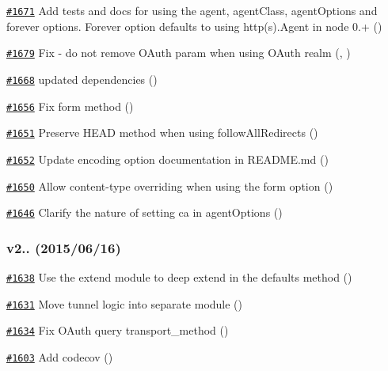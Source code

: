 \begin{DoxyItemize}
\item \href{https://github.com/request/request/pull/1671}{\tt \#1671} Add tests and docs for using the agent, agent\+Class, agent\+Options and forever options. Forever option defaults to using http(s).Agent in node 0.+ ()
\item \href{https://github.com/request/request/pull/1679}{\tt \#1679} Fix -\/ do not remove O\+Auth param when using O\+Auth realm (, )
\item \href{https://github.com/request/request/pull/1668}{\tt \#1668} updated dependencies ()
\item \href{https://github.com/request/request/pull/1656}{\tt \#1656} Fix form method ()
\item \href{https://github.com/request/request/pull/1651}{\tt \#1651} Preserve H\+E\+AD method when using follow\+All\+Redirects ()
\item \href{https://github.com/request/request/pull/1652}{\tt \#1652} Update {\ttfamily encoding} option documentation in R\+E\+A\+D\+M\+E.\+md ()
\item \href{https://github.com/request/request/pull/1650}{\tt \#1650} Allow content-\/type overriding when using the {\ttfamily form} option ()
\item \href{https://github.com/request/request/pull/1646}{\tt \#1646} Clarify the nature of setting {\ttfamily ca} in {\ttfamily agent\+Options} ()
\end{DoxyItemize}

\subsubsection*{v2.. (2015/06/16)}


\begin{DoxyItemize}
\item \href{https://github.com/request/request/pull/1638}{\tt \#1638} Use the {\ttfamily extend} module to deep extend in the defaults method ()
\item \href{https://github.com/request/request/pull/1631}{\tt \#1631} Move tunnel logic into separate module ()
\item \href{https://github.com/request/request/pull/1634}{\tt \#1634} Fix O\+Auth query transport\+\_\+method ()
\item \href{https://github.com/request/request/pull/1603}{\tt \#1603} Add codecov ()
\end{DoxyItemize}

